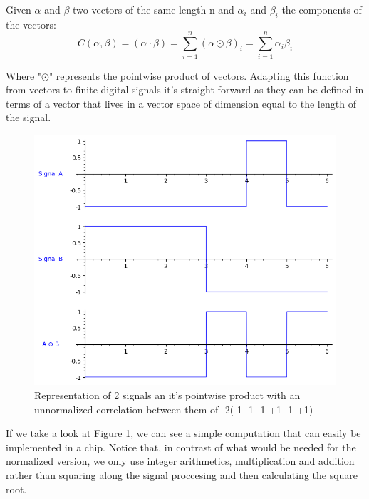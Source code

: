 \begin{definition}\label{def:2}
  Given $\alpha$ and $\beta$ two vectors of the same length n and $\alpha_{i}$
  and $\beta_{i}$ the components of the vectors:
  \begin{equation}\label{eq:2}
    C(\alpha , \beta) = (\alpha \cdot  \beta) = \sum_{i=1}^n(\alpha \odot \beta)_{i}= \sum_{i=1}^{n} \alpha_{i}\beta_{i}
  \end{equation}

\end{definition}

Where "$\odot$" represents the pointwise product of vectors. Adapting this function from vectors to finite digital signals it's straight
forward as they can be defined in terms of a vector that lives in a vector
space of dimension equal to the length of the signal.


\begin{figure}[ht!] %
\begin{center}
\includegraphics[width=0.7\linewidth]{Chapters/Introduction/signals_correlation}
\end{center}
\caption{Representation of 2 signals an it's pointwise product with an unnormalized correlation between them of -2(-1 -1 -1 +1 -1 +1)}
\label{introduction_signals_hadamard}
\end{figure}

If we take a look at Figure \ref{introduction_signals_hadamard}, we can see
a simple computation that can easily be implemented in a chip. Notice that,
in contrast of what would be needed for the normalized version, we only use
integer arithmetics, multiplication and addition rather than squaring along the
signal proccesing and then calculating the square root.











